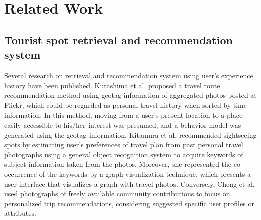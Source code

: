 \documentclass[journal]{IAENGtran}
\begin{document}
\section{Related Work}
\label{sec:Related Work}
\subsection{Tourist spot retrieval and recommendation system}
\label{subsec:Tourist spot retrieval and recommendation system}
Several research on retrieval and recommendation system using user's experience history have been published.
Kurashima et al.\cite{Codd01} proposed a travel route recommendation method using geotag information of aggregated photos posted at Flickr, which could be regarded as personal travel history when sorted by time information.
In this method, moving from a user's present location to a place easily accessible to his/her interest was presumed, and a behavior model was generated using the geotag information.
Kitamura et al.\cite{Codd02} recommended sightseeing spots by estimating user's preferences of travel plan from past personal travel photographs using a general object recognition system to acquire keywords of subject information taken from the photos.
Moreover, she represented the co-occurrence of the keywords by a graph visualization technique, which presents a user interface that visualizes a graph with travel photos.
Conversely, Cheng et al.\cite{Codd03} used photographs of freely available community contributions to focus on personalized trip recommendations, considering suggested specific user profiles or attributes.
\end{document}
